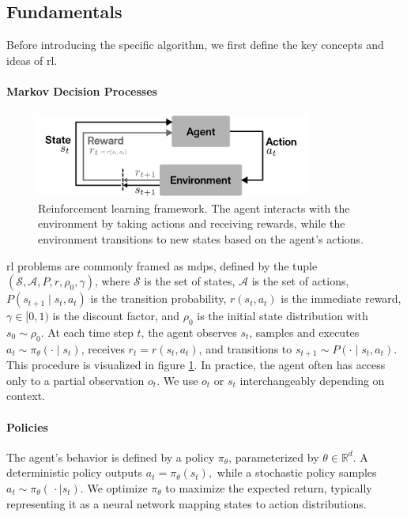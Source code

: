 \subsection{Fundamentals}
Before introducing the specific algorithm, we first define the key concepts and ideas of \gls{rl}.
\paragraph{Markov Decision Processes}

\begin{figure}
\centering
\includegraphics[width=0.8\textwidth]{images/figs/rl.pdf}
\caption[Reinforcement learning framework]{Reinforcement learning framework. The agent interacts with the environment by taking actions and receiving rewards, while the environment transitions to new states based on the agent's actions.}
\label{fig:rl_diagram}
\end{figure}

\gls{rl} problems are commonly framed as \gls{mdp}s, defined by the tuple \((\mathcal{S}, \mathcal{A}, P, r, \rho_0, \gamma)\), where \(\mathcal{S}\) is the set of states, \(\mathcal{A}\) is the set of actions, \(P(s_{t+1}\!\mid\!s_t,a_t)\) is the transition probability, \(r(s_t,a_t)\) is the immediate reward, \(\gamma \in [0,1)\) is the discount factor, and \(\rho_0\) is the initial state distribution with \(s_0 \sim \rho_0\). At each time step \(t\), the agent observes \(s_t\), samples and executes \(a_t \sim \pi_\theta(\cdot\mid s_t)\), receives \(r_t = r(s_t,a_t)\), and transitions to \(s_{t+1} \sim P(\cdot\mid s_t,a_t)\). This procedure is visualized in figure \ref{fig:rl_diagram}. In practice, the agent often has access only to a partial observation \(o_t\). We use \(o_t\) or \(s_t\) interchangeably depending on context.

\paragraph{Policies}
The agent’s behavior is defined by a policy \(\pi_{\theta}\), parameterized by \(\theta \in \mathbb{R}^{d}\). A deterministic policy outputs
$ 
a_t = \pi_{\theta}(s_t),
$
while a stochastic policy samples
$
a_t \sim \pi_{\theta}(\,\cdot\mid s_t).
$
We optimize \(\pi_\theta\) to maximize the expected return, typically representing it as a neural network mapping states to action distributions.

